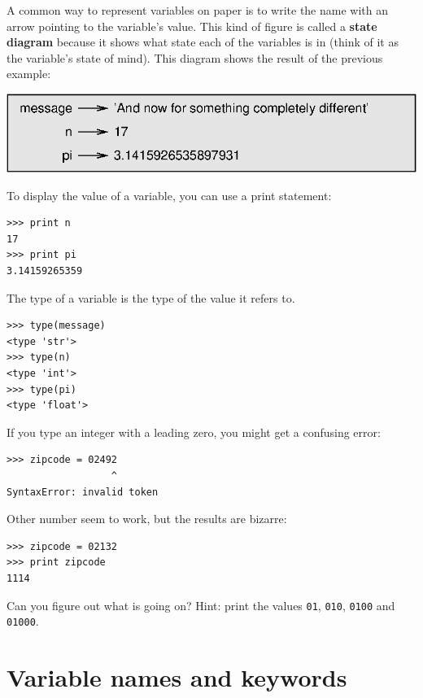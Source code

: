 \documentclass[10pt]{book}
\begin{document}

A common way to represent variables on paper is to write the name with
an arrow pointing to the variable's value.  This kind of figure is
called a {\bf state diagram} because it shows what state each of the
variables is in (think of it as the variable's state of mind).
This diagram shows the result of the previous example:

\beforefig
\centerline{\includegraphics{figs/state2.eps}}
\afterfig

To display the value of a variable, you can use a print statement:

\beforeverb
\begin{verbatim}
>>> print n
17
>>> print pi
3.14159265359
\end{verbatim}
\afterverb
%
The type of a variable is the type of the value it refers to.

\beforeverb
\begin{verbatim}
>>> type(message)
<type 'str'>
>>> type(n)
<type 'int'>
>>> type(pi)
<type 'float'>
\end{verbatim}
\afterverb
%
\begin{ex}
If you type an integer with a leading zero, you might get
a confusing error:

\beforeverb
\begin{verbatim}
>>> zipcode = 02492
                  ^
SyntaxError: invalid token
\end{verbatim}
\afterverb

Other number seem to work, but the results are bizarre:

\beforeverb
\begin{verbatim}
>>> zipcode = 02132
>>> print zipcode
1114
\end{verbatim}
\afterverb

Can you figure out what is going on?  Hint: print the
values {\tt 01}, {\tt 010}, {\tt 0100} and {\tt 01000}.


\end{ex}




\section{Variable names and keywords}
\end{document}
